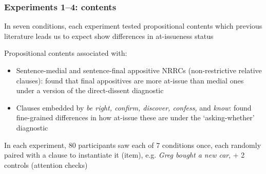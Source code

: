 \documentclass[compress, xcolor = dvipsnames, aspectratio=169]{beamer}
\begin{document}
	\begin{frame}\frametitle{Experiments 1–4: contents}\small
		In seven conditions, each experiment tested propositional contents which previous literature leads us to expect show differences in at-issueness status\medskip\\ \pause

		Propositional contents associated with:
		\begin{itemize}
			\item Sentence-medial and sentence-final appositive NRRCs (non-restrictive relative clauses): \citealt{syrett_experimental_2015} found that final appositives are more at-issue than medial ones under a version of the direct-dissent diagnostic\pause

			\item Clauses embedded by \emph{be right, confirm, discover, confess,} and \emph{know}: \citealt{degen-tonhauser-glossa} found fine-grained differences in how at-issue these are under the `asking-whether' diagnostic\pause
		\end{itemize}

		In each experiment, 80 participants saw each of 7 conditions once, each randomly paired with a clause to instantiate it (item), e.g. \emph{Greg bought a new car}, + 2 controls (attention checks)
		
	\end{frame}
\end{document}
